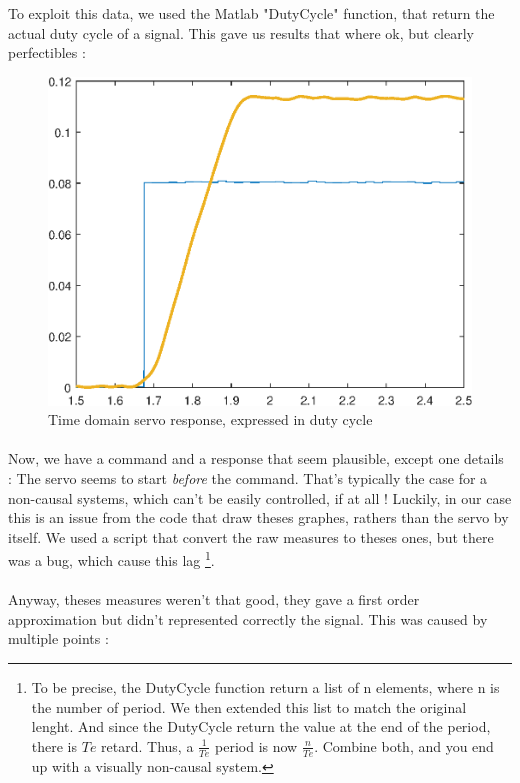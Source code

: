 To exploit this data, we used the Matlab "DutyCycle" function, that return the actual duty cycle of a signal.
This gave us results that where ok, but clearly perfectibles :

\begin{figure}[!hbt]
    \centering
    \includegraphics[width=\SchematicWidth]{images/Servos/Duty-Forced.eps}
    \caption{Time domain servo response, expressed in duty cycle}
\end{figure}
\FloatBarrier

\paragraph{}
Now, we have a command and a response that seem plausible, except one details : The servo seems to start 
\textit{before} the command. That's typically the case for a non-causal systems, which can't be easily controlled,
if at all !
Luckily, in our case this is an issue from the code that draw theses graphes, rathers than the servo by itself.
We used a script that convert the raw measures to theses ones, but there was a bug, which cause this lag \footnote{
    To be precise, the DutyCycle function return a list of n elements, where n is the number of period. We then
    extended this list to match the original lenght. And since the DutyCycle return the value at the end of the 
    period, there is $Te$ retard. Thus, a $\frac{1}{Te}$ period is now $\frac{n}{Te}$. 
    Combine both, and you end up with a visually non-causal system.
}.

\paragraph{}
Anyway, theses measures weren't that good, they gave a first order approximation but didn't represented 
correctly the signal. This was caused by multiple points :

